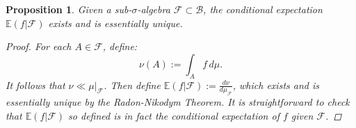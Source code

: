 \documentclass[a4paper]{article}
\theoremstyle{plain}
\newtheorem{prop} [theorem]{Proposition}
\theoremstyle{definition}
\begin{document}
	\begin{prop}
		Given a sub-$\sigma$-algebra $\mathcal{F} \subset \mathcal{B}$, the conditional expectation $\mathbb{E}(f|\mathcal{F})$ exists and is essentially unique.
		\begin{proof}
			For each $A \in \mathcal{F}$, define:
			\begin{equation*}
				\nu(A) := \int_{A}f\,d\mu.
			\end{equation*}
			It follows that $\nu \ll \mu|_{\mathcal{F}}$. Then define $\mathbb{E}(f|\mathcal{F}) := \frac{d\nu}{d\mu_{\mathcal{F}}}$, which exists and is essentially unique by the Radon-Nikodym Theorem. It is straightforward to check that $\mathbb{E}(f|\mathcal{F})$ so defined is in fact the conditional expectation of $f$ given $\mathcal{F}$. 
		\end{proof}
	\end{prop}
	
\end{document}

